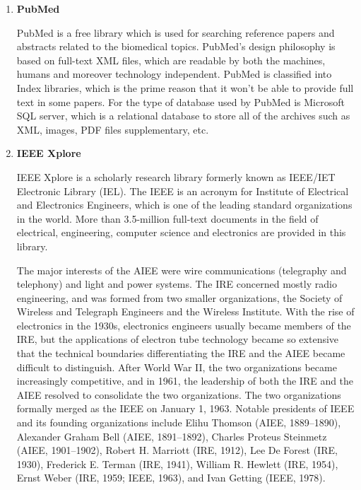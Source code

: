 \begin{enumerate}
	
	\item\textbf{PubMed}
	\setlength{\parindent}{1em}
		
	 PubMed is a free library which is used for searching reference papers and abstracts related to the biomedical topics.
	 PubMed’s design philosophy is based on full-text XML files, which are readable by both the machines, humans and moreover technology independent.
	 PubMed is classified into Index libraries, which is the prime reason that it won’t be able to provide full text in some papers.
	 For the type of database used by PubMed is Microsoft SQL server, which is a relational database to store all of the archives such as XML, images, PDF files supplementary, etc. 
		
	\item\textbf{IEEE Xplore}
	\setlength{\parindent}{1em}
	
	IEEE Xplore is a scholarly research library formerly known as IEEE/IET Electronic Library (IEL).
	The IEEE is an acronym for Institute of Electrical and Electronics Engineers, which is one of the leading standard organizations in the world.
	More than 3.5-million full-text documents in the field of electrical, engineering, computer science and electronics are provided in this library. 
	
	The major interests of the AIEE were wire communications (telegraphy and telephony) and light and power systems. 
    The IRE concerned mostly radio engineering, and was formed from two smaller organizations, the Society of Wireless and Telegraph Engineers and the Wireless Institute.
    With the rise of electronics in the 1930s, electronics engineers usually became members of the IRE, but the applications of 
    electron tube technology became so extensive that the technical boundaries differentiating the IRE and the AIEE became difficult to distinguish. 
    After World War II, the two organizations became increasingly competitive, and in 1961, the leadership of both the IRE 
    and the AIEE resolved to consolidate the two organizations.
    The two organizations formally merged as the IEEE on January 1, 1963.
    Notable presidents of IEEE and its founding organizations include Elihu Thomson (AIEE, 1889–1890), Alexander Graham Bell (AIEE, 1891–1892), 
    Charles Proteus Steinmetz (AIEE, 1901–1902), 
    Robert H. Marriott (IRE, 1912), Lee De Forest (IRE, 1930), Frederick 
    E. Terman (IRE, 1941), William R. Hewlett (IRE, 1954),
    Ernst Weber (IRE, 1959; IEEE, 1963), and Ivan Getting (IEEE, 1978).


\end{enumerate}
